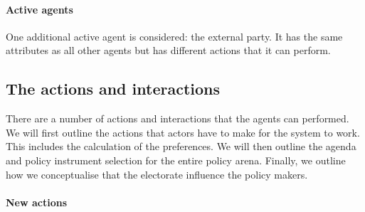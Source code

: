 \documentclass[11pt]{article}
\begin{document}
\paragraph{Active agents}

One additional active agent is considered: the external party. It has the same attributes as all other agents but has different actions that it can perform.



\subsection{The actions and interactions}


There are a number of actions and interactions that the agents can performed. We will first outline the actions that actors have to make for the system to work. This includes the calculation of the preferences. We will then outline the agenda and policy instrument selection for the entire policy arena. Finally, we outline how we conceptualise that the electorate influence the policy makers.

\paragraph{New actions}





\appendix


 

\end{document}
